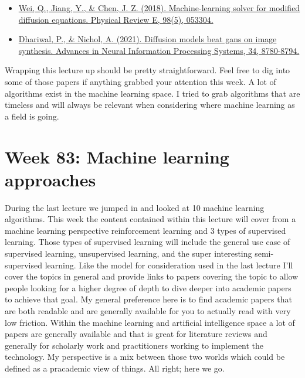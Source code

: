 \documentclass{article}
\begin{document}
\begin{itemize}
\item \href{https://arxiv.org/pdf/1808.04519.pdf}{Wei, Q., Jiang, Y., \& Chen, J. Z. (2018). Machine-learning solver for modified diffusion equations. Physical Review E, 98(5), 053304.} \cite{wei2018machine}
\item \href{https://proceedings.neurips.cc/paper/2021/file/49ad23d1ec9fa4bd8d77d02681df5cfa-Paper.pdf}{Dhariwal, P., \& Nichol, A. (2021). Diffusion models beat gans on image synthesis. Advances in Neural Information Processing Systems, 34, 8780-8794.} \cite{dhariwal2021diffusion}
 
\end{itemize}
Wrapping this lecture up should be pretty straightforward. Feel free to dig into some of those papers if anything grabbed your attention this week. A lot of algorithms exist in the machine learning space. I tried to grab algorithms that are timeless and will always be relevant when considering where machine learning as a field is going. 

\section{Week 83: Machine learning approaches}
During the last lecture we jumped in and looked at 10 machine learning algorithms. This week the content contained within this lecture will cover from a machine learning perspective reinforcement learning and 3 types of supervised learning. Those types of supervised learning will include the general use case of supervised learning, unsupervised learning, and the super interesting semi-supervised learning. Like the model for consideration used in the last lecture I’ll cover the topics in general and provide links to papers covering the topic to allow people looking for a higher degree of depth to dive deeper into academic papers to achieve that goal. My general preference here is to find academic papers that are both readable and are generally available for you to actually read with very low friction. Within the machine learning and artificial intelligence space a lot of papers are generally available and that is great for literature reviews and generally for scholarly work and practitioners working to implement the technology. My perspective is a mix between those two worlds which could be defined as a pracademic view of things. All right; here we go. 
\end{document}
